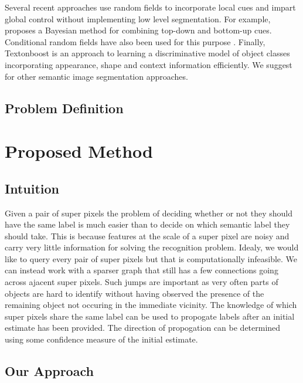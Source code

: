 \documentclass{article} %
\begin{document}
Several recent approaches use random fields to incorporate local cues and impart global control without implementing low level segmentation. For example, \cite{Kumar:2005:OC:1068507.1068889} proposes a Bayesian method for combining top-down and bottom-up cues. Conditional random fields have also been used for this purpose \cite{Kumar:2005:HFF:1097115.1097790} \cite{Richard04multiscaleconditional}. Finally, Textonboost \cite{Shotton06textonboost:joint} is an approach to learning a discriminative model of object classes incorporating appearance, shape and context information efficiently. We suggest \cite{SegmentRegionsParts} for other semantic image segmentation approaches.

\subsection{Problem Definition}
\label{sec:Problem}

\section{Proposed Method}
\label{sec:Proposed}
\subsection{Intuition}
\label{sec:intuition}
Given a pair of super pixels the problem of deciding whether or not they should have the same label is much easier than to decide on which semantic label they should take. This is because features at the scale of a super pixel are noisy and carry very little information for solving the recognition problem.
Idealy, we would like to query every pair of super pixels but that is computationally infeasible. We can instead work with a sparser graph that still has a few connections going across ajacent super pixels. Such jumps are important as very often parts of objects are hard to identify without having observed the presence of the remaining object not occuring in the immediate vicinity.
The knowledge of which super pixels share the same label can be used to propogate labels after an initial estimate has been provided. The direction of propogation can be determined using some confidence measure of the initial estimate.

\subsection{Our Approach}
\end{document}
